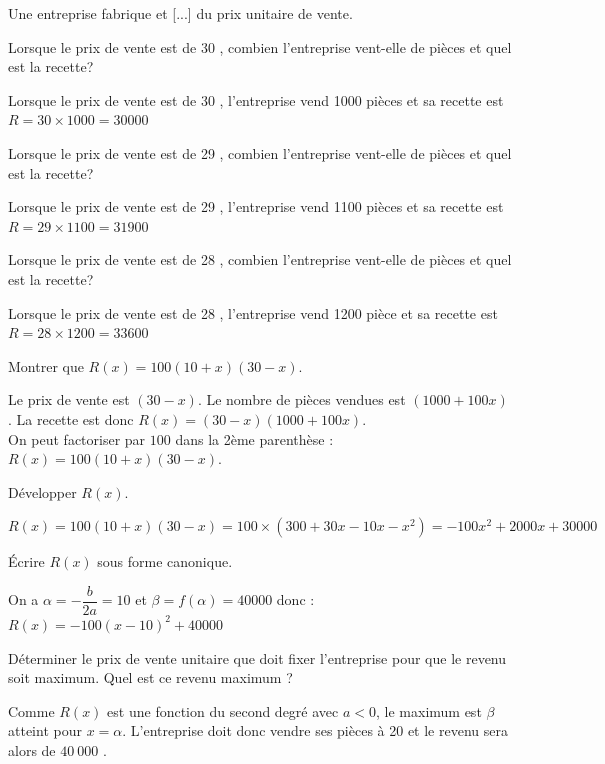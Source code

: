 \documentclass[12pt,a4paper]{article}  %
\begin{document}
Une entreprise fabrique et [...] du prix unitaire de vente.
\begin{enumMet}
	\item \begin{enumMet}
		\item Lorsque le prix de vente est de 30 \EUR{}, combien l'entreprise vent-elle de pièces et quel est la recette? 
		\begin{corrBox}
			Lorsque le prix de vente est de 30 \EUR{}, l'entreprise vend 1000 pièces et sa recette est $R=30\times1000=30000$
		\end{corrBox}
		\item Lorsque le prix de vente est de 29 \EUR{}, combien l'entreprise vent-elle de pièces et quel est la recette? \bareme{0,5}
		\begin{corrBox}
			Lorsque le prix de vente est de 29 \EUR{}, l'entreprise vend 1100 pièces et sa recette est $R=29\times1100=31900$
		\end{corrBox}
		\item Lorsque le prix de vente est de 28 \EUR{}, combien l'entreprise vent-elle de pièces et quel est la recette? 
		\begin{corrBox}
			Lorsque le prix de vente est de 28 \EUR{}, l'entreprise vend 1200 pièce et sa recette est $R=28\times1200=33600$
		\end{corrBox}
	\end{enumMet}
	\item Montrer que $R(x)=100(10+x)(30-x)$. \bareme{1,5}
	\begin{corrBox}
		Le prix de vente est $(30-x)$. Le nombre de pièces vendues est $(1000+100x)$. La recette est donc $R(x)=(30-x)(1000+100x)$.\\
		On peut factoriser par $100$ dans la 2ème parenthèse : $R(x)=100(10+x)(30-x)$.
	\end{corrBox}
	\item Développer $R(x)$. \bareme{1}
	\begin{corrBox}
		$R(x)=100(10+x)(30-x)=100\times(300+30x-10x-x^2)=-100x^2+2000x+30000$
	\end{corrBox}
	\item Écrire $R(x)$ sous forme canonique. \bareme{1}
	\begin{corrBox}
		On a $\alpha=-\dfrac{b}{2a}=10$ et $\beta=f(\alpha)=40000$ donc :\\
		$R(x)=-100(x-10)^2+40000$
	\end{corrBox}
	\item Déterminer le prix de vente unitaire que doit fixer l'entreprise pour que le revenu soit maximum. Quel est ce revenu maximum ? \bareme{1}
	\begin{corrBox}
		Comme $R(x)$ est une fonction du second degré avec $a<0$, le maximum est $\beta$ atteint pour $x=\alpha$. L'entreprise doit donc vendre ses pièces à 20 \EUR{} et le revenu sera alors de $40\ 000$ \EUR{}.
	\end{corrBox}
\end{enumMet}
\end{document}

